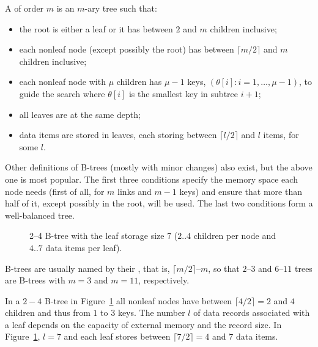 \begin{Definition}
A  of order $m$ is an $m$-ary tree such that:
\begin{itemize} 
\item the root is either a leaf or it has between $2$ and
$m$ children inclusive; 
\item each nonleaf node (except possibly the root) has
between $\lceil m/2 \rceil$ and $m$ children inclusive;
\item each nonleaf node with $\mu$ children has $\mu-1$
keys, $(\theta[i]: i=1,\ldots,\mu-1)$, to guide the search where $\theta[i]$ is the smallest key in subtree $i+1$;
\item all leaves are at the same depth;
\item data items are stored in leaves, each storing between $\lceil l/2 \rceil$ and $l$ items, for some $l$.
\end{itemize} 
\end{Definition}

Other definitions of B-trees (mostly with minor changes) also exist, but
the above one is most popular. The first three conditions specify the
memory space each node needs (first of all, for $m$ links and $m-1$
keys) and ensure that more than half of it, except possibly in the root,
will be used. The last two conditions form a well-balanced tree.

\begin{figure}[htb]
\begin{center}
\caption[2--4 B-tree with the leaf storage size 7.]%
{2--4 B-tree with the leaf storage size 7
($2..4$ children per node and $4..7$ data items per leaf).}
\label{mtr-b4} 
\end{center}
\end{figure}

\begin{note}
B-trees are usually named by their , 
that is, $\lceil m/2 \rceil$--$m$, so that $2$--$3$ and $6$--$11$ 
trees are B-trees with
$m=3$ and $m=11$, respectively.
\end{note}

\begin{Example} In a
$2-4$ B-tree in Figure~\ref{mtr-b4} 
all nonleaf nodes have between 
$\lceil 4/2 \rceil = 2$ and $4$ children and thus from
$1$ to $3$ keys. The number $l$ of 
data records associated with a leaf depends on 
the capacity of external memory and the record size. 
In Figure~\ref{mtr-b4}, $l=7$ and each leaf stores between 
$\lceil 7/2 \rceil = 4$ and $7$  data items.
\end{Example}


